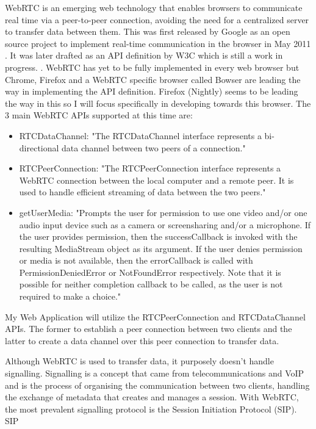 \documentclass[]{report}
\begin{document}
			WebRTC is an emerging web technology that enables browsers to communicate real time via a peer-to-peer connection, avoiding the need for a centralized server to transfer data between them. This was first released by Google as an open source project to implement real-time communication in the browser in May 2011 \cite{Google WebRTC Release}. It was later drafted as an API definition by W3C which is still a work in progress. \cite{W3C WebRTC Definition}. WebRTC has yet to be fully implemented in every web browser but Chrome, Firefox and a WebRTC specific browser called Bowser are leading the way in implementing the API definition. Firefox (Nightly) seems to be leading the way in this so I will focus specifically in developing towards this browser\cite{WebRTC browser support}.
			The 3 main WebRTC APIs supported at this time are:
				\begin{itemize}
					\item RTCDataChannel:
					"The RTCDataChannel interface represents a bi-directional data channel between two peers of a connection." \cite{Mozilla Web API} 
					\item RTCPeerConnection:
					"The RTCPeerConnection interface represents a WebRTC connection between the local computer and a remote peer. It is used to handle efficient streaming of data between the two peers." 
					\cite{Mozilla Web API} 
					\item getUserMedia:
					"Prompts the user for permission to use one video and/or one audio input device such as a camera or screensharing and/or a microphone. If the user provides permission, then the successCallback is invoked with the resulting MediaStream object as its argument. If the user denies permission or media is not available, then the errorCallback is called with PermissionDeniedError or NotFoundError respectively. Note that it is possible for neither completion callback to be called, as the user is not required to make a choice."
					\cite{Mozilla Web API} 
				\end{itemize}
			My Web Application will utilize the RTCPeerConnection and RTCDataChannel APIs. The former to establish a peer connection between two clients and the latter to create a data channel over this peer connection to transfer data.
			
			Although WebRTC is used to transfer data, it purposely doesn't handle signalling. Signalling is a concept that came from telecommunications and VoIP and is the process of organising the communication between two clients, handling the exchange of metadata that creates and manages a session. With WebRTC, the most prevalent signalling protocol is the Session Initiation Protocol (SIP). SIP 
				
\end{document}
